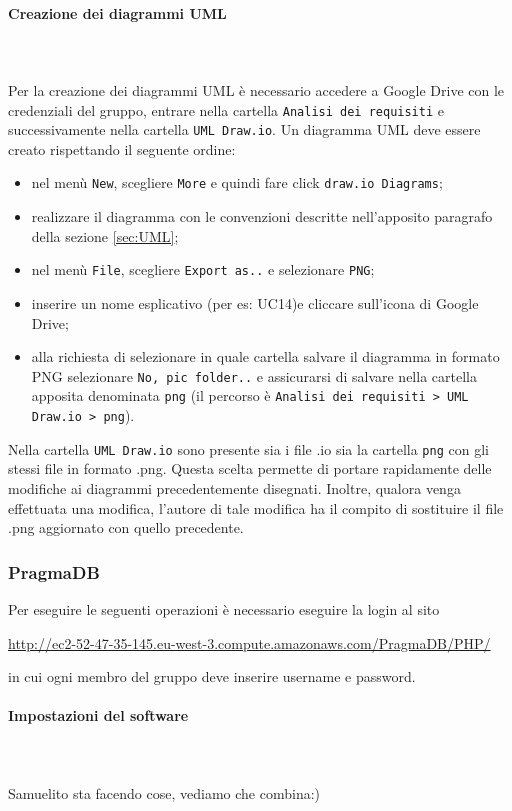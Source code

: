 \paragraph{Creazione dei diagrammi UML} \mbox{}\\ \mbox{}\\
Per la creazione dei diagrammi UML\glo{} è necessario accedere a Google Drive 
con le credenziali del gruppo, entrare nella cartella \texttt{Analisi dei requisiti} e 
successivamente nella cartella \texttt{UML Draw.io}. Un diagramma UML deve essere creato
rispettando il seguente ordine:
	\begin{itemize}
		\item nel menù \texttt{New}, scegliere \texttt{More} e quindi fare
			click \texttt{draw.io Diagrams};
		\item realizzare il diagramma con le convenzioni descritte nell'apposito
			paragrafo della sezione \ref{sec:UML}; 
		\item nel menù \texttt{File}, scegliere \texttt{Export as..} e selezionare \texttt{PNG};
		\item inserire un nome esplicativo (per es: UC14)e cliccare sull'icona di
			Google Drive;
		\item alla richiesta di selezionare in quale cartella salvare il diagramma 
			in formato PNG selezionare \texttt{No, pic folder..} e assicurarsi di salvare 
			nella cartella apposita denominata \texttt{png} (il percorso è 
			\texttt{Analisi dei requisiti > UML Draw.io > png}).
	\end{itemize}
Nella cartella \texttt{UML Draw.io} sono presente sia i file .io sia la cartella \texttt{png}
con gli stessi file in formato .png. Questa scelta permette di portare rapidamente 
delle modifiche ai diagrammi precedentemente disegnati. Inoltre, qualora venga 
effettuata una modifica, l'autore di tale modifica ha il compito di sostituire
il file .png aggiornato con quello precedente. 

\subsubsection{PragmaDB} 
Per eseguire le seguenti operazioni è necessario eseguire la login al sito 
\centerline{\url{http://ec2-52-47-35-145.eu-west-3.compute.amazonaws.com/PragmaDB/PHP/}}
in cui ogni membro del gruppo deve inserire username e password.
\paragraph{Impostazioni del software} \mbox{}\\ \mbox{}\\
Samuelito sta facendo cose, vediamo che combina:)

